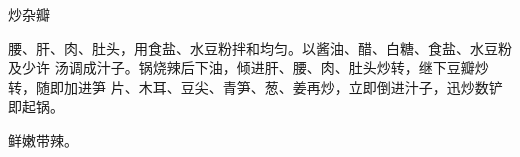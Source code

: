 \begin{recipe}{炒杂瓣}

\ingredients


\preparation

腰、肝、肉、肚头，用食盐、水豆粉拌和均匀。以酱油、醋、白糖、食盐、水豆粉及少许
汤调成汁子。锅烧辣后下油，倾进肝、腰、肉、肚头炒转，继下豆瓣炒转，随即加进笋
片、木耳、豆尖、青笋、葱、姜再炒，立即倒进汁子，迅炒数铲即起锅。

\features

鲜嫩带辣。

\end{recipe}

